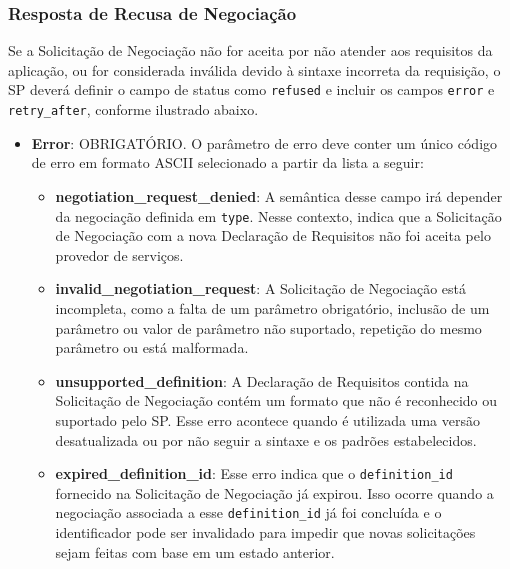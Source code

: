 \subsubsection*{Resposta de Recusa de Negociação}\label{subsubsection:response-negotiation-error}

Se a Solicitação de Negociação não for aceita por não atender aos requisitos da aplicação, ou for considerada inválida devido à sintaxe incorreta da requisição, o SP deverá definir o campo de status como \texttt{refused} e incluir os campos \texttt{error} e \texttt{retry\_after}, conforme ilustrado abaixo.



\begin{itemize}

    \item \textbf{Error}: OBRIGATÓRIO. O parâmetro de erro deve conter um único código de erro em formato ASCII selecionado a partir da lista a seguir:

    \begin{itemize}
    
        \item \textbf{negotiation\_request\_denied}: A semântica desse campo irá depender da negociação definida em \texttt{type}. Nesse contexto, indica que a Solicitação de Negociação com a nova Declaração de Requisitos não foi aceita pelo provedor de serviços.

        \item \textbf{invalid\_negotiation\_request}: A Solicitação de Negociação está incompleta, como a falta de um parâmetro obrigatório, inclusão de um parâmetro ou valor de parâmetro não suportado, repetição do mesmo parâmetro ou está malformada.

        \item \textbf{unsupported\_definition}: A Declaração de Requisitos contida na Solicitação de Negociação contém um formato que não é reconhecido ou suportado pelo \acs{SP}. Esse erro acontece quando é utilizada uma versão desatualizada ou por não seguir a sintaxe e os padrões estabelecidos.

        \item \textbf{expired\_definition\_id}: Esse erro indica que o \texttt{definition\_id} fornecido na Solicitação de Negociação já expirou. Isso ocorre quando a negociação associada a esse \texttt{definition\_id} já foi concluída e o identificador pode ser invalidado para impedir que novas solicitações sejam feitas com base em um estado anterior.
        

\end{itemize}
\end{itemize}
